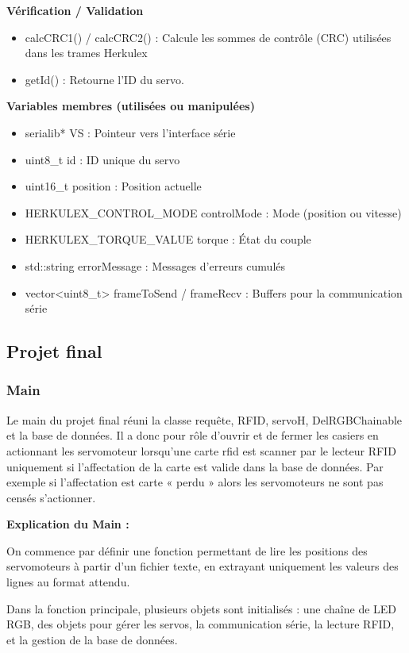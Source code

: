 \documentclass[main.tex]{subfiles}
\begin{document}
\textbf{Vérification / Validation}

\begin{itemize}
\item calcCRC1() / calcCRC2() : Calcule les sommes de contrôle (CRC) utilisées dans les trames Herkulex
\item getId() : Retourne l’ID du servo.
\end{itemize}
 
\textbf{Variables membres (utilisées ou manipulées)}

\begin{itemize}
\item serialib* VS : Pointeur vers l’interface série
\item uint8\_t id : ID unique du servo
\item uint16\_t position : Position actuelle
\item HERKULEX\_CONTROL\_MODE controlMode : Mode (position ou vitesse)
\item HERKULEX\_TORQUE\_VALUE torque : État du couple
\item std::string errorMessage : Messages d’erreurs cumulés
\item vector<uint8\_t> frameToSend / frameRecv : Buffers pour la communication série
\end{itemize}

\subsection{Projet final}

\subsubsection{Main}

Le main du projet final réuni la classe requête, RFID, servoH, DelRGBChainable et la base de données. Il a donc pour rôle d’ouvrir et de fermer les casiers en actionnant les servomoteur lorsqu’une carte rfid est scanner par le lecteur RFID uniquement si l’affectation de la carte est valide dans la base de données. Par exemple si l’affectation est carte « perdu » alors les servomoteurs ne sont pas censés s’actionner.

\textbf{Explication du Main :}

On commence par définir une fonction permettant de lire les positions des servomoteurs à partir d’un fichier texte, en extrayant uniquement les valeurs des lignes au format attendu.

Dans la fonction principale, plusieurs objets sont initialisés : une chaîne de LED RGB, des objets pour gérer les servos, la communication série, la lecture RFID, et la gestion de la base de données.
\end{document}
